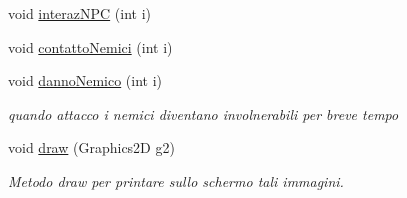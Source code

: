 \begin{DoxyCompactItemize}
\item 
void \hyperlink{class_entita_1_1_giocatore_aaf1d3a52e79be598afe385c91a9f4d0c}{interaz\+N\+PC} (int i)
\item 
void \hyperlink{class_entita_1_1_giocatore_a867fc5532a9f20042ecde7951b83c499}{contatto\+Nemici} (int i)
\item 
void \hyperlink{class_entita_1_1_giocatore_a0814609fcd5c78e217a57e65bb65f7b4}{danno\+Nemico} (int i)
\begin{DoxyCompactList}\small\item\em quando attacco i nemici diventano involnerabili per breve tempo \end{DoxyCompactList}\item 
void \hyperlink{class_entita_1_1_giocatore_ae8c972c0fb4fcbc09c2219dd32cbd053}{draw} (Graphics2D g2)
\begin{DoxyCompactList}\small\item\em Metodo draw per printare sullo schermo tali immagini. \end{DoxyCompactList}\end{DoxyCompactItemize}
